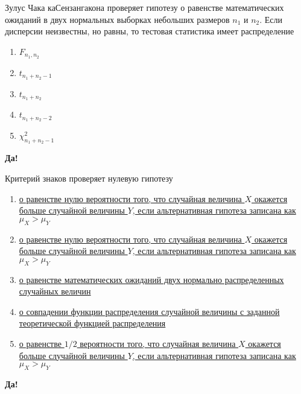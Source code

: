 \documentclass[t]{beamer}
\begin{document}
 \begin{frame} \label{56-Yes} 
\begin{block}{56} 

Зулус Чака каСензангакона проверяет гипотезу  о равенстве математических ожиданий в двух нормальных выборках небольших размеров $n_1$   и  $n_2$. Если дисперсии неизвестны, но равны, то тестовая статистика имеет распределение
 


 \end{block} 
\begin{enumerate} 
\item[] \hyperlink{56-No}{\beamergotobutton{} $F_{n_1,n_2}$}
\item[] \hyperlink{56-Yes}{\beamergotobutton{} $t_{n_1+n_2-1}$}
\item[] \hyperlink{56-No}{\beamergotobutton{} $t_{n_1+n_2}$}
\item[] \hyperlink{56-No}{\beamergotobutton{} $t_{n_1+n_2-2}$}
\item[] \hyperlink{56-No}{\beamergotobutton{} $\chi^2_{n_1+n_2-1}$}
\end{enumerate} 

 \textbf{Да!} 
 \hyperlink{57}{}\end{frame} 


 \begin{frame} \label{57-Yes} 
\begin{block}{57} 

Критерий знаков проверяет нулевую гипотезу
 


 \end{block} 
\begin{enumerate} 
\item[] \hyperlink{57-Yes}{\beamergotobutton{} о равенстве нулю вероятности того, что случайная величина $X$ окажется больше случайной величины $Y$, если альтернативная гипотеза записана как $\mu_X>\mu_Y$}
\item[] \hyperlink{57-No}{\beamergotobutton{} о равенстве нулю вероятности того, что случайная величина $X$ окажется больше случайной величины $Y$, если альтернативная гипотеза записана как $\mu_X>\mu_Y$ }
\item[] \hyperlink{57-No}{\beamergotobutton{} о равенстве математических ожиданий двух нормально распределенных случайных величин}
\item[] \hyperlink{57-No}{\beamergotobutton{} о совпадении функции распределения случайной величины с заданной теоретической функцией распределения}
\item[] \hyperlink{57-No}{\beamergotobutton{} о равенстве $1/2$ вероятности того, что случайная величина $X$ окажется больше случайной величины $Y$, если альтернативная гипотеза записана как $\mu_X>\mu_Y$}
\end{enumerate} 

 \textbf{Да!} 
 \hyperlink{58}{}\end{frame} 
\end{document}
